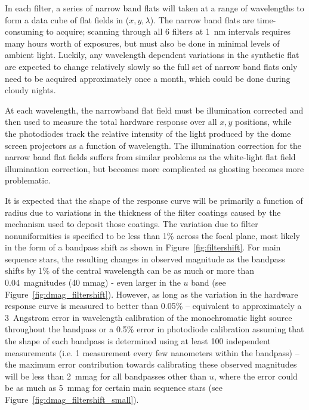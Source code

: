 \documentclass[12pt,preprint]{aastex}
\begin{document}
In each filter, a series of narrow band flats will taken at a range of
wavelengths to form a data cube of flat fields in ($x,y,\lambda$). The
narrow band flats are time-consuming to acquire; scanning through all
6 filters at 1~nm intervals requires many hours worth of exposures,
but must also be done in minimal levels of ambient light. Luckily, any
wavelength dependent variations in the synthetic flat are expected to
change relatively slowly so the full set of narrow band flats only
need to be acquired approximately once a month, which could be done
during cloudy nights.


At each wavelength, the narrowband flat field must be illumination
corrected and then used to measure the total hardware response over
all $x,y$ positions, while the photodiodes track the relative intensity of 
the light produced by the dome screen projectors as a function of wavelength.
The illumination correction for the narrow band flat fields suffers from
similar problems as the white-light flat field illumination correction, but
becomes more complicated as ghosting becomes more problematic. 


It is expected that the shape
of the response curve will be primarily a function of radius due to
variations in the thickness of the filter coatings caused by the
mechanism used to deposit those coatings. The variation due to filter
nonuniformities is specified to be less than 1\% across the focal
plane, most likely in the form of a bandpass shift as shown in
Figure~\ref{fig:filtershift}. For main sequence stars, the resulting
changes in observed magnitude as the bandpass shifts by 1\% of the
central wavelength can be as much or more than 0.04~magnitudes (40
mmag) - even larger in the $u$ band (see
Figure~\ref{fig:dmag_filtershift}). However, as long as the variation
in the hardware response curve is measured to better than 0.05\% --
equivalent to approximately a 3~Angstrom error in wavelength
calibration of the monochromatic light source throughout the bandpass
or a 0.5\% error in photodiode calibration assuming that the shape of
each bandpass is determined using at least 100 independent
measurements (i.e. 1 measurement every few nanometers within the bandpass) --
the maximum error contribution towards calibrating these observed magnitudes
will be less than 2~mmag for all bandpasses other than $u$, where the
error could be as much as 5~mmag for certain main sequence stars (see
Figure~\ref{fig:dmag_filtershift_small}). 
\end{document}
